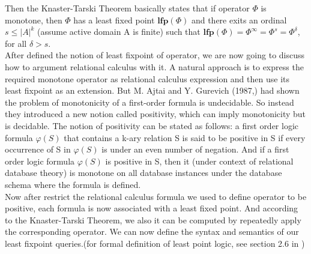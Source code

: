 Then the Knaster-Tarski Theorem basically states that if operator $\Phi$ is monotone, then $\Phi$ has a least fixed point $\textbf{lfp}(\Phi)$ and there exits an ordinal $s\leq |A|^k$ (assume active domain A is finite) such that $\textbf{lfp}(\Phi)=\Phi^{\infty}=\Phi^s=\Phi^{\delta}$, for all $\delta > s$.\\
After defined the notion of least fixpoint of operator, we are now going to discuss how to argument relational calculus with it. A natural approach is to express the required monotone operator as relational calculus expression and then use its least fixpoint as an extension. But M. Ajtai and Y. Gurevich (1987,\cite{Ajtai}) had shown the problem of monotonicity of a first-order formula is undecidable. So instead they introduced a new notion called positivity, which can imply monotonicity but is decidable. The notion of positivity can be stated as follows: a first order logic formula $\varphi(S)$ that contains a k-ary relation S is said to be positive in S if every occurrence of S in $\varphi(S)$ is under an even number of negation. And if a first order logic formula $\varphi(S)$ is positive in S, then it (under context of relational database theory) is monotone on all database instances under the database schema where the formula is defined.\\ 
Now after restrict the relational calculus formula we used to define operator to be positive, each formula is now associated with a least fixed point. And according to the Knaster-Tarski Theorem, we also it can be computed by repeatedly apply the corresponding operator. We can now define the syntax and semantics of our least fixpoint queries.(for formal definition of least point logic, see section 2.6 in \cite{kolaitis1})\\

